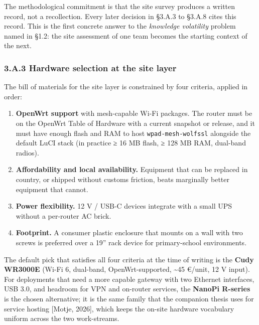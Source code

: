 The methodological commitment is that the site survey produces a written
record, not a recollection. Every later decision in §3.A.3 to §3.A.8
cites this record. This is the first concrete answer to the
\emph{knowledge volatility} problem named in §1.2: the site assessment
of one team becomes the starting context of the next.

\hypertarget{a.3-hardware-selection-at-the-site-layer}{%
\subsubsection{3.A.3 Hardware selection at the site
layer}\label{a.3-hardware-selection-at-the-site-layer}}

The bill of materials for the site layer is constrained by four
criteria, applied in order:

\begin{enumerate}
\def\labelenumi{\arabic{enumi}.}
\tightlist
\item
  \textbf{OpenWrt support} with mesh-capable Wi-Fi packages. The router
  must be on the OpenWrt Table of Hardware with a current snapshot or
  release, and it must have enough flash and RAM to host
  \texttt{wpad-mesh-wolfssl} alongside the default LuCI stack (in
  practice ≥ 16 MB flash, ≥ 128 MB RAM, dual-band radios).
\item
  \textbf{Affordability and local availability.} Equipment that can be
  replaced in country, or shipped without customs friction, beats
  marginally better equipment that cannot.
\item
  \textbf{Power flexibility.} 12 V / USB-C devices integrate with a
  small UPS without a per-router AC brick.
\item
  \textbf{Footprint.} A consumer plastic enclosure that mounts on a wall
  with two screws is preferred over a 19'' rack device for
  primary-school environments.
\end{enumerate}

The default pick that satisfies all four criteria at the time of writing
is the \textbf{Cudy WR3000E} (Wi-Fi 6, dual-band, OpenWrt-supported,
\textasciitilde45 €/unit, 12 V input). For deployments that need a more
capable gateway with two Ethernet interfaces, USB 3.0, and headroom for
VPN and on-router services, the \textbf{NanoPi R-series} is the chosen
alternative; it is the same family that the companion thesis uses for
service hosting {[}Motje, 2026{]}, which keeps the on-site hardware
vocabulary uniform across the two work-streams.

